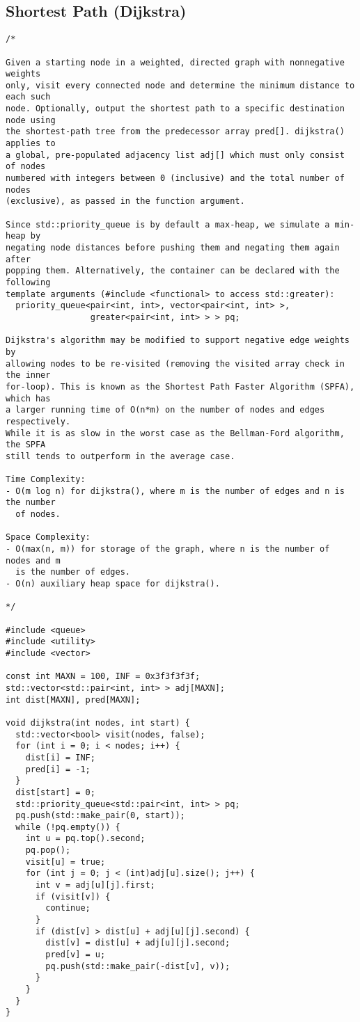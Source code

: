 \subsection{Shortest Path (Dijkstra)}
\begin{lstlisting}
/*

Given a starting node in a weighted, directed graph with nonnegative weights
only, visit every connected node and determine the minimum distance to each such
node. Optionally, output the shortest path to a specific destination node using
the shortest-path tree from the predecessor array pred[]. dijkstra() applies to
a global, pre-populated adjacency list adj[] which must only consist of nodes
numbered with integers between 0 (inclusive) and the total number of nodes
(exclusive), as passed in the function argument.

Since std::priority_queue is by default a max-heap, we simulate a min-heap by
negating node distances before pushing them and negating them again after
popping them. Alternatively, the container can be declared with the following
template arguments (#include <functional> to access std::greater):
  priority_queue<pair<int, int>, vector<pair<int, int> >,
                 greater<pair<int, int> > > pq;

Dijkstra's algorithm may be modified to support negative edge weights by
allowing nodes to be re-visited (removing the visited array check in the inner
for-loop). This is known as the Shortest Path Faster Algorithm (SPFA), which has
a larger running time of O(n*m) on the number of nodes and edges respectively.
While it is as slow in the worst case as the Bellman-Ford algorithm, the SPFA
still tends to outperform in the average case.

Time Complexity:
- O(m log n) for dijkstra(), where m is the number of edges and n is the number
  of nodes.

Space Complexity:
- O(max(n, m)) for storage of the graph, where n is the number of nodes and m
  is the number of edges.
- O(n) auxiliary heap space for dijkstra().

*/

#include <queue>
#include <utility>
#include <vector>

const int MAXN = 100, INF = 0x3f3f3f3f;
std::vector<std::pair<int, int> > adj[MAXN];
int dist[MAXN], pred[MAXN];

void dijkstra(int nodes, int start) {
  std::vector<bool> visit(nodes, false);
  for (int i = 0; i < nodes; i++) {
    dist[i] = INF;
    pred[i] = -1;
  }
  dist[start] = 0;
  std::priority_queue<std::pair<int, int> > pq;
  pq.push(std::make_pair(0, start));
  while (!pq.empty()) {
    int u = pq.top().second;
    pq.pop();
    visit[u] = true;
    for (int j = 0; j < (int)adj[u].size(); j++) {
      int v = adj[u][j].first;
      if (visit[v]) {
        continue;
      }
      if (dist[v] > dist[u] + adj[u][j].second) {
        dist[v] = dist[u] + adj[u][j].second;
        pred[v] = u;
        pq.push(std::make_pair(-dist[v], v));
      }
    }
  }
}


\end{lstlisting}
